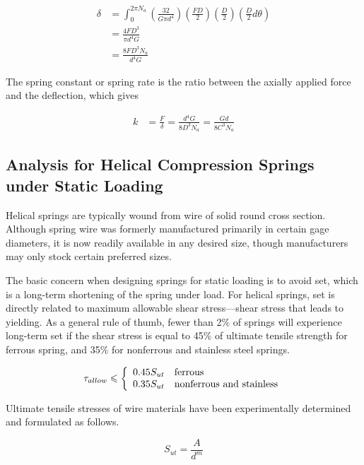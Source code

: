 \documentclass[
10pt,
a4paper,
openany,
svgnames,
]{book}
\begin{document}
\begin{align*}
  \delta  &= \int_0^{2\pi N_a} \left( \frac{32}{G\pi d^4} \right)\left( \frac{FD}{2} \right)\left( \frac{D}{2} \right)\left( \frac{D}{2}d\theta  \right) \\ 
          &= \frac{4FD^3}{\pi d^4G} \\ 
          &= \frac{8FD^3N_a}{d^4G}
\end{align*}

The spring constant or spring rate is the ratio between the axially applied force and the deflection, which gives

\begin{align}
  \label{eqn: spring constant}
  k &= \frac{F}{\delta} = \frac{d^4G}{8D^3N_a} = \frac{Gd}{8C^3N_a} 
\end{align}

\subsection{Analysis for Helical Compression Springs under Static Loading}

Helical springs are typically wound from wire of solid round cross section. Although spring wire was formerly manufactured primarily in certain gage diameters, it is now readily available in any desired size, though manufacturers may only stock certain preferred sizes.

The basic concern when designing springs for static loading is to avoid set, which is a long-term shortening of the spring under load. For helical springs, set is directly related to maximum allowable shear stress—shear stress that leads to yielding. As a general rule of thumb, fewer than 2\% of springs will experience long-term set if the shear stress is equal to 45\% of ultimate tensile strength for ferrous spring, and 35\% for nonferrous and stainless steel springs.

\begin{equation}
  \tau_{allow} \leqslant \left\{
    \begin{array}{ll}
       0.45 S_{ut} & \text{ferrous} \hfill \\ 
       0.35 S_{ut} & \text{nonferrous and stainless} 
     \end{array} \right.
\end{equation}

Ultimate tensile stresses of wire materials have been experimentally determined and formulated as follows.

\begin{equation} \label{eqn: spring material strength}
  S_{ut} = \frac{A}{d^m}
\end{equation}
\end{document}

